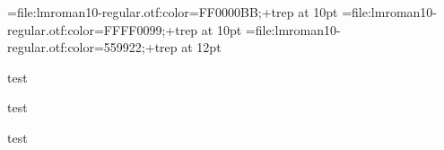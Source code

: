 

\font\testa=file:lmroman10-regular.otf:color=FF0000BB;+trep at 10pt
\font\testb=file:lmroman10-regular.otf:color=FFFF0099;+trep at 10pt
\font\testc=file:lmroman10-regular.otf:color=559922;+trep   at 12pt

\testa test \par
\testb test \par
\testc test \par
\bye
